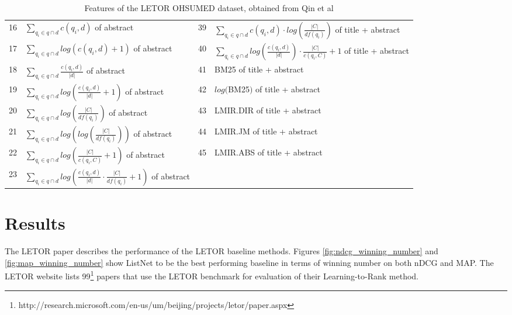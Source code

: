 \begin{table}[!h]
{\begin{tabular}{p{0.29cm}|p{6.88cm}||p{0.29cm}|p{6.90cm}}
16& $\sum\nolimits_{q_i \in q \cap d}c(q_i, d)$ of abstract		& 39& $\sum\nolimits_{q_i \in q \cap d}c(q_i,d)\cdot log(\frac{|C|}{df(q_i)})$ of title + abstract\\
17& $\sum\nolimits_{q_i \in q \cap d}log(c(q_i, d)+1)$ of abstract		& 40& $\sum\nolimits_{q_i \in q \cap d} log(\frac{c(q_i,d)}{|d|}) \cdot \frac{|C|}{c(q_i,C)}+1$ of title + abstract\\
18& $\sum\nolimits_{q_i \in q \cap d}\frac{c(q_i,d)}{|d|}$ of abstract		& 41& BM25 of title + abstract\\
19& $\sum\nolimits_{q_i \in q \cap d}log(\frac{c(q_i,d)}{|d|}+1)$ of abstract		& 42& $log($BM25$)$ of title + abstract\\
20& $\sum\nolimits_{q_i \in q \cap d}log(\frac{|C|}{df(q_i)})$ of abstract	& 43& LMIR.DIR of title + abstract\\

21& $\sum\nolimits_{q_i \in q \cap d}log(log(\frac{|C|}{df(q_i)}))$ of abstract					& 44& LMIR.JM of title + abstract\\
22&  $\sum\nolimits_{q_i \in q \cap d}log(\frac{|C|}{c(q_i,C)}+1)$ of abstract					& 45& LMIR.ABS of title + abstract\\
23& $\sum\nolimits_{q_i \in q \cap d}log(\frac{c(q_i,d)}{|d|} \cdot \frac{|C|}{df(q_i)}+1)$ of abstract					& & \\
\end{tabular}
}
\caption{Features of the LETOR OHSUMED dataset, obtained from Qin et al\cite{Qin2010}}
\label{tbl:features_ohsumed}
\end{table}
\section{Results}
The LETOR paper\cite{Qin2010} describes the performance of the LETOR baseline methods. Figures \ref{fig:ndcg_winning_number} and \ref{fig:map_winning_number} show ListNet to be the best performing baseline in terms of winning number on both \ac{nDCG} and \ac{MAP}. The LETOR website lists 99\footnote{http://research.microsoft.com/en-us/um/beijing/projects/letor/paper.aspx} papers that use the LETOR benchmark for evaluation of their Learning-to-Rank method.\\


